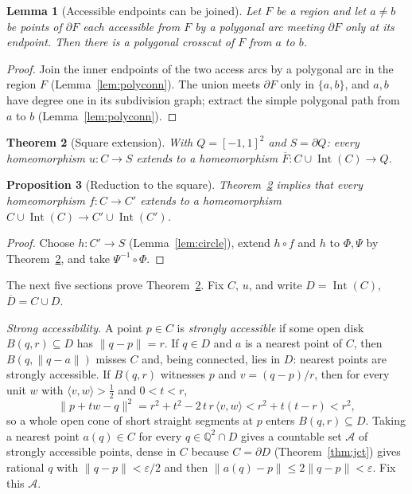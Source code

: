 \documentclass[11pt,a4paper]{article}
\theoremstyle{jsplain}
\newtheorem{theorem}{Theorem}[section]
\newtheorem{lemma}[theorem]{Lemma}
\newtheorem{proposition}[theorem]{Proposition}
\theoremstyle{jsdefn}
\newcommand{\Int}{\operatorname{Int}}
\begin{document}
\begin{lemma}[Accessible endpoints can be joined]\label{lem:join}
Let $F$ be a region and
let $a\ne b$ be points of $\partial F$ each accessible from $F$ by a
polygonal arc meeting $\partial F$ only at its endpoint. Then there is
a polygonal crosscut of $F$ from $a$ to $b$.
\end{lemma}
\begin{proof}
Join the inner endpoints of the two access arcs by a polygonal arc in
the region $F$ (Lemma~\ref{lem:polyconn}). The union meets
$\partial F$ only in $\{a,b\}$, and $a,b$ have degree one in its
subdivision graph; extract the simple polygonal path from $a$ to $b$
(Lemma~\ref{lem:polyconn}).
\end{proof}

\begin{theorem}[Square extension]\label{thm:square}
With $Q=[-1,1]^2$ and $S=\partial Q$: every homeomorphism $u:C\to S$
extends to a homeomorphism $\overline F:C\cup\Int(C)\to Q$.
\end{theorem}

\begin{proposition}[Reduction to the square]\label{prop:reduce}
Theorem~\ref{thm:square} implies that every homeomorphism $f:C\to C'$
extends to a homeomorphism
$C\cup\Int(C)\to C'\cup\Int(C')$.
\end{proposition}
\begin{proof}
Choose $h:C'\to S$ (Lemma~\ref{lem:circle}), extend $h\circ f$ and $h$
to $\Phi,\Psi$ by Theorem~\ref{thm:square}, and take
$\Psi^{-1}\circ\Phi$.
\end{proof}

The next five sections prove Theorem~\ref{thm:square}. Fix $C$, $u$,
and write
$D=\Int(C)$, $\overline D=C\cup D$.

\emph{Strong accessibility.} A point $p\in C$ is \emph{strongly
accessible} if some open disk $B(q,r)\subseteq D$ has $\|q-p\|=r$. If
$q\in D$ and $a$ is a nearest point of $C$, then $B(q,\|q-a\|)$ misses
$C$ and, being connected, lies in $D$: nearest points are strongly
accessible. If $B(q,r)$ witnesses $p$ and $v=(q-p)/r$, then for every
unit $w$ with $\langle v,w\rangle>\tfrac12$ and $0<t<r$,
\[
\|p+tw-q\|^2=r^2+t^2-2\,t\,r\,\langle v,w\rangle<r^2+t(t-r)<r^2,
\]
so a whole open cone of short straight segments at $p$ enters
$B(q,r)\subseteq D$. Taking a nearest point $a(q)\in C$ for every
$q\in\mathbb Q^2\cap D$ gives a countable set $\mathcal A$ of strongly
accessible points, dense in $C$ because $C=\partial D$
(Theorem~\ref{thm:jct}) gives rational $q$ with $\|q-p\|<\varepsilon/2$
and then $\|a(q)-p\|\le2\|q-p\|<\varepsilon$. Fix this $\mathcal A$.
\end{document}
